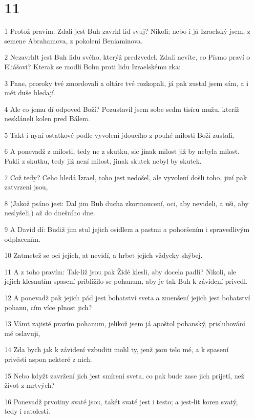 \chapter{11}

\par 1 Protož pravím: Zdali jest Buh zavrhl lid svuj? Nikoli; nebo i já Izraelský jsem, z semene Abrahamova, z pokolení Beniaminova.
\par 2 Nezavrhlt jest Buh lidu svého, kterýž predzvedel. Zdali nevíte, co Písmo praví o Eliášovi? Kterak se modlí Bohu proti lidu Izraelskému rka:
\par 3 Pane, proroky tvé zmordovali a oltáre tvé rozkopali, já pak zustal jsem sám, a i mét duše hledají.
\par 4 Ale co jemu dí odpoved Boží? Pozustavil jsem sobe sedm tisícu mužu, kteríž neskláneli kolen pred Bálem.
\par 5 Takt i nyní ostatkové podle vyvolení jdoucího z pouhé milosti Boží zustali,
\par 6 A ponevadž z milosti, tedy ne z skutku, sic jinak milost již by nebyla milost. Pakli z skutku, tedy již není milost, jinak skutek nebyl by skutek.
\par 7 Což tedy? Ceho hledá Izrael, toho jest nedošel, ale vyvolení došli toho, jiní pak zatvrzeni jsou,
\par 8 (Jakož psáno jest: Dal jim Buh ducha zkormoucení, oci, aby nevideli, a uši, aby neslyšeli,) až do dnešního dne.
\par 9 A David dí: Budiž jim stul jejich osidlem a pastmi a pohoršením i spravedlivým odplacením.
\par 10 Zatmetež se oci jejich, at nevidí, a hrbet jejich vždycky shýbej.
\par 11 A z toho pravím: Tak-liž jsou pak Židé klesli, aby docela padli? Nikoli, ale jejich klesnutím spasení priblížilo se pohanum, aby je tak Buh k závidení privedl.
\par 12 A ponevadž pak jejich pád jest bohatství sveta a zmenšení jejich jest bohatství pohanu, cím více plnost jich?
\par 13 Vámt zajisté pravím pohanum, jelikož jsem já apoštol pohanský, prisluhování mé oslavuji,
\par 14 Zda bych jak k závidení vzbuditi mohl ty, jenž jsou telo mé, a k spasení privésti aspon nekteré z nich.
\par 15 Nebo kdyžt zavržení jich jest smírení sveta, co pak bude zase jich prijetí, než život z mrtvých?
\par 16 Ponevadž prvotiny svaté jsou, takét svaté jest i testo; a jest-lit koren svatý, tedy i ratolesti.
